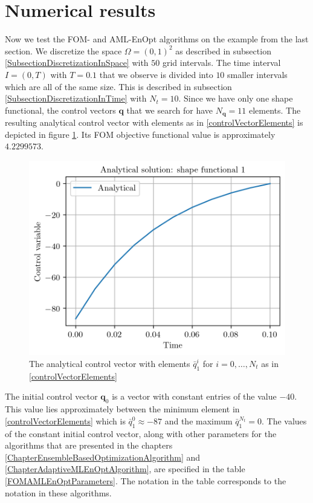 \section{Numerical results}

Now we test the FOM- and AML-EnOpt algorithms on the example from the last section. We discretize the space $\Omega=(0,1)^2$ as described in subsection \ref{SubsectionDiscretizationInSpace} with $50$ grid intervals. The time interval $I=(0,T)$ with $T=0.1$ that we observe is divided into $10$ smaller intervals which are all of the same size. This is described in subsection \ref{SubsectionDiscretizationInTime} with $N_t=10$. Since we have only one shape functional, the control vectors $\mathbf{q}$ that we search for have $N_\mathbf{q}=11$ elements. The resulting analytical control vector with elements as in \eqref{controlVectorElements} is depicted in figure \ref{AnalyticalControlVectorPlot}. Its FOM objective functional value is approximately $4.2299573$.

\begin{figure}
\centering
\includegraphics{Plots/analyticalControlVector.png}
\caption{\label{AnalyticalControlVectorPlot}The analytical control vector with elements $\bar{q}^i_1$ for $i=0,\dotsc,N_t$ as in \eqref{controlVectorElements}}
\end{figure}

The initial control vector $\mathbf{q}_0$ is a vector with constant entries of the value $-40$. This value lies approximately between the minimum element in \eqref{controlVectorElements} which is $\bar{q}^0_1\approx-87$ and the maximum $\bar{q}^{N_t}_1=0$. The values of the constant initial control vector, along with other parameters for the algorithms that are presented in the chapters \ref{ChapterEnsembleBasedOptimizationAlgorithm} and \ref{ChapterAdaptiveMLEnOptAlgorithm}, are specified in the table \ref{FOMAMLEnOptParameters}. The notation in the table corresponds to the notation in these algorithms.

